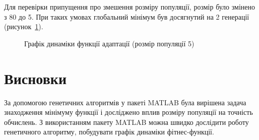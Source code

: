 Для перевірки припущення про змешення розміру популяції, розмір було змінено з 80 до 5. При таких умовах глобальний мінімум був досягнутий на 2 генерації (рисунок~\ref{fig:plot_dynamic_2}). 

\begin{figure}[H]
  \centering
{}
  \captionsetup{justification=centering}
  \caption{Графік динаміки функції адаптації (розмір популяції 5)}
  \label{fig:plot_dynamic_2}
\end{figure}

%
%
\section*{Висновки} 
За допомогою генетичних алгоритмів у пакеті MATLAB була вирішена задача знаходження мінімуму функції і досліджено вплив  розміру популяції на точність обчислень. З використанням пакету MATLAB можна швидко дослідити роботу генетичного алгоритму, побудувати графік динаміки фітнес-функції. 

